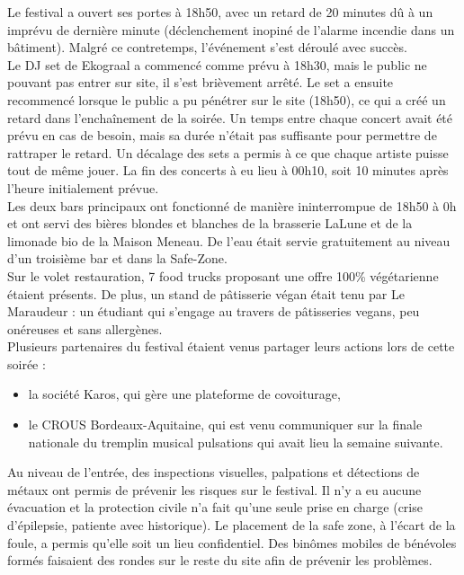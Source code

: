 \documentclass[12pt,a4paper]{report}
\begin{document}
Le festival a ouvert ses portes à 18h50, avec un retard de 20 minutes dû à un imprévu de dernière minute (déclenchement inopiné de l'alarme incendie dans un bâtiment). Malgré ce contretemps, l'événement s'est déroulé avec succès.\\

Le DJ set de Ekograal a commencé comme prévu à 18h30, mais le public ne pouvant pas entrer sur site, il s'est brièvement arrêté. Le set a ensuite recommencé lorsque le public a pu pénétrer sur le site (18h50), ce qui a créé un retard dans l'enchaînement de la soirée. Un temps entre chaque concert avait été prévu en cas de besoin, mais sa durée n'était pas suffisante pour permettre de rattraper le retard. Un décalage des sets a permis à ce que chaque artiste puisse tout de même jouer. La fin des concerts à eu lieu à 00h10, soit 10 minutes après l’heure initialement prévue.\\

Les deux bars principaux ont fonctionné de manière ininterrompue de 18h50 à 0h et ont servi des bières blondes et blanches de la brasserie LaLune et de la limonade bio de la Maison Meneau. De l’eau était servie gratuitement au niveau d’un troisième bar et dans la Safe-Zone.\\

Sur le volet restauration, 7 food trucks proposant une offre 100\% végétarienne étaient présents. De plus, un stand de pâtisserie végan était tenu par Le Maraudeur : un étudiant qui s'engage au travers de pâtisseries vegans, peu onéreuses et sans allergènes.\\

Plusieurs partenaires du festival étaient venus partager leurs actions lors de cette soirée : 
\begin{itemize}
\item la société Karos, qui gère une plateforme de covoiturage,
\item le CROUS Bordeaux-Aquitaine, qui est venu communiquer sur la finale nationale du tremplin musical pulsations qui avait lieu la semaine suivante.\\
\end{itemize}

Au niveau de l’entrée, des inspections visuelles, palpations et détections de métaux ont permis de prévenir les risques sur le festival. Il n'y a eu aucune évacuation et la protection civile n’a fait qu’une seule prise en charge (crise d'épilepsie, patiente avec historique). Le placement de la safe zone, à l'écart de la foule, a permis qu'elle soit un lieu confidentiel. Des binômes mobiles de bénévoles formés faisaient des rondes sur le reste du site afin de prévenir les problèmes.\\
\end{document}
